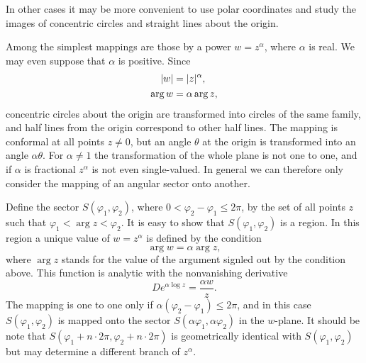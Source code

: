 In other cases it may be more convenient to use polar coordinates and study the images of concentric circles and straight lines about the origin.

Among the simplest mappings are those by a power $w=z^{\alpha}$, where $\alpha$ is real. We may even suppose that $\alpha$ is positive. Since \begin{align*}
    \lvert w \rvert &=\lvert z \rvert^{\alpha}, \\
    \arg w &= \alpha \arg z,
\end{align*}
concentric circles about the origin are transformed into circles of the same family, and half lines from the origin correspond to other half lines. The mapping is conformal at all points $z \neq 0$, but an angle $\theta$ at the origin is transformed into an angle $\alpha \theta$. For $\alpha \neq 1$ the transformation of the whole plane is not one to one, and if $\alpha$ is fractional $z^{\alpha}$ is not even single-valued. In general we can therefore only consider the mapping of an angular sector onto another.

Define the sector $S(\varphi_1,\varphi_2)$, where $0<\varphi_2-\varphi_1 \le 2\pi$, by the set of all points $z$ such that $\varphi_1 < \arg z < \varphi_2$. It is easy to show that $S(\varphi_1,\varphi_2)$ is a region. In this region a unique value of $w=z^{\alpha}$ is defined by the condition $$\arg w=\alpha \arg z,$$ where $\arg z$ stands for the value of the argument signled out by the condition above. This function is analytic with the nonvanishing derivative $$De^{\alpha \log z}=\dfrac{\alpha w}{z}.$$ The mapping is one to one only if $\alpha(\varphi_2-\varphi_1) \le 2\pi$, and in this case $S(\varphi_1,\varphi_2)$ is mapped onto the sector $S(\alpha \varphi_1,\alpha \varphi_2)$ in the $w$-plane. It should be note that $S(\varphi_1+n \cdot 2\pi, \varphi_2+n \cdot 2\pi)$ is geometrically identical with $S(\varphi_1,\varphi_2)$ but may determine a different branch of $z^{\alpha}$.


